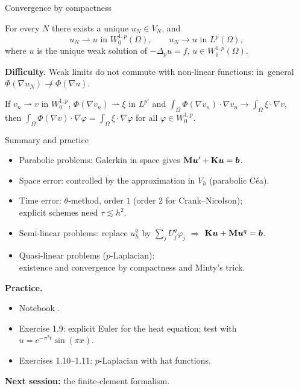 \begin{frame}{Convergence by compactness}
  \begin{theorem}
    For every $N$ there exists a unique $u_N \in V_N$, and
    \[
      u_N \rightharpoonup u \text{ in } W^{1,p}_0(\Omega), \qquad u_N \to u \text{ in } L^p(\Omega),
    \]
    where $u$ is the unique weak solution of $-\Delta_p u = f$, $u \in W^{1,p}_0(\Omega)$.
  \end{theorem}
  \textbf{Difficulty.} Weak limits do not commute with non-linear functions: \mbox{in general $\Phi(\nabla u_N) \not\rightharpoonup \Phi(\nabla u)$.}
  \begin{lemma}
    If $v_n \rightharpoonup v$ in $W^{1,p}_0$, $\Phi(\nabla v_n) \rightharpoonup \xi$ in $L^{p'}$ and
    $\int_\Omega \Phi(\nabla v_n) \cdot \nabla v_n \to \int_\Omega \xi \cdot \nabla v$,\\
    then $\int_\Omega \Phi(\nabla v)\cdot\nabla\varphi = \int_\Omega \xi\cdot\nabla \varphi$ for all $\varphi \in W^{1,p}_0$.
  \end{lemma}
\end{frame}

\begin{frame}{Summary and practice}
  \begin{itemize}
    \item Parabolic problems: Galerkin in space gives $\mathbf{M} \bm{u}' + \mathbf{K} \bm{u} = \bm{b}$.
    \item Space error: controlled by the approximation in $V_h$ (parabolic Céa).
    \item Time error: $\theta$-method, order $1$ (order $2$ for Crank--Nicolson);\\ explicit schemes need $\tau \lesssim h^2$.
    \item Semi-linear problems: replace $u_h^q$ by $\sum_j U_j^q\varphi_j$ $\Rightarrow$ $\mathbf{K}\bm{u} + \mathbf{M}\bm{u}^q = \bm{b}$.
    \item Quasi-linear problems ($p$-Laplacian):\\ existence and convergence by compactness and Minty's trick.
  \end{itemize}
  \bigskip
  \textbf{Practice.}
  \begin{itemize}
    \item Notebook .
    \item Exercise 1.9: explicit Euler for the heat equation; test with $u = e^{-\pi^2 t}\sin(\pi x)$.
    \item Exercises 1.10--1.11: $p$-Laplacian with hat functions.
  \end{itemize}
  \medskip
  \textbf{Next session:} the finite-element formalism.
\end{frame}
